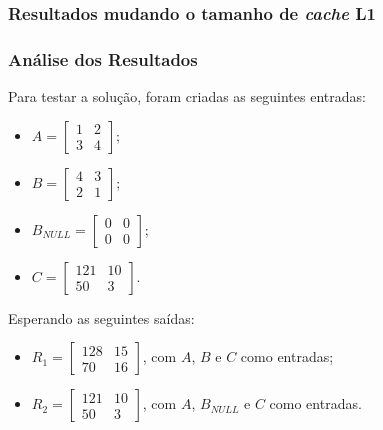 \documentclass{beamer}
\begin{document}
    \begin{frame}
        \frametitle{Resultados mudando o tamanho de \textit{cache} L1}

        \begin{figure}[h]
            \centering
        \end{figure}

    \end{frame}

    \begin{frame}
        \frametitle{Análise dos Resultados}

        \begingroup
        Para testar a solução, foram criadas as seguintes entradas:

        \begin{itemize}
            \item $ A = \begin{bmatrix} 1 & 2 \\ 3 & 4 \end{bmatrix} $;
            \item $ B = \begin{bmatrix} 4 & 3 \\ 2 & 1 \end{bmatrix} $;
            \item $ B_{NULL} = \begin{bmatrix} 0 & 0 \\ 0 & 0 \end{bmatrix} $;
            \item $ C = \begin{bmatrix} 121 & 10 \\ 50 & 3 \end{bmatrix} $.
        \end{itemize}
        \endgroup

        \begingroup
        Esperando as seguintes saídas:
        \begin{itemize}
            \item $ R_1 = \begin{bmatrix} 128 & 15 \\ 70 & 16 \end{bmatrix} $,
                  com $ A $, $ B $ e $ C $ como entradas;
            \item $ R_2 = \begin{bmatrix} 121 & 10 \\ 50 & 3 \end{bmatrix} $,
                  com $ A $, $ B_{NULL} $ e $ C $ como entradas.
        \end{itemize}
        \endgroup

    \end{frame}
\end{document}
